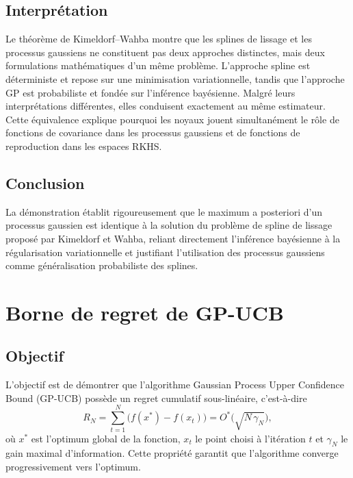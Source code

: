 \documentclass[12pt]{article}
\newcommand{\xs}{x^{*}}
\begin{document}
\subsection*{Interprétation}

Le théorème de Kimeldorf--Wahba montre que les splines de lissage et les processus
gaussiens ne constituent pas deux approches distinctes, mais deux formulations
mathématiques d'un même problème. L'approche spline est déterministe et repose sur
une minimisation variationnelle, tandis que l'approche GP est probabiliste et
fondée sur l'inférence bayésienne. Malgré leurs interprétations différentes, elles
conduisent exactement au même estimateur. Cette équivalence explique pourquoi les
noyaux jouent simultanément le rôle de fonctions de covariance dans les processus
gaussiens et de fonctions de reproduction dans les espaces RKHS.

\subsection*{Conclusion}

La démonstration établit rigoureusement que le maximum a posteriori d'un processus
gaussien est identique à la solution du problème de spline de lissage proposé par
Kimeldorf et Wahba, reliant directement l'inférence bayésienne à la régularisation
variationnelle et justifiant l'utilisation des processus gaussiens comme
généralisation probabiliste des splines.

\newpage
\section*{Borne de regret de GP-UCB}

\subsection*{Objectif}

L'objectif est de démontrer que l'algorithme Gaussian Process Upper Confidence
Bound (GP-UCB) possède un regret cumulatif sous-linéaire, c'est-à-dire
\[
\boxed{\, R_N = \sum_{t=1}^N \bigl(f(\xs) - f(x_t)\bigr) = O^{*}\!\bigl(\sqrt{N\,\gamma_N}\bigr), \,}
\]
où $\xs$ est l'optimum global de la fonction, $x_t$ le point choisi à l'itération
$t$ et $\gamma_N$ le gain maximal d'information. Cette propriété garantit que
l'algorithme converge progressivement vers l'optimum.
\end{document}
